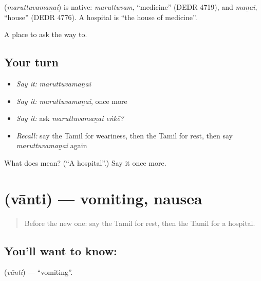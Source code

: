 \begin{cousinweb}
\textbf{} (\emph{maruttuvamaṉai}) is native: \emph{maruttuvam}, \textquotedblleft{}medicine\textquotedblright{} (DEDR 4719), and \emph{maṉai}, \textquotedblleft{}house\textquotedblright{} (DEDR 4776). A hospital is \textquotedblleft{}the house of medicine\textquotedblright{}.
\end{cousinweb}

\begin{grammarlens}[title={What you've built}]
A place to ask the way to.
\end{grammarlens}

\subsection*{Your turn}
\begin{itemize}
\raggedright
  \item \emph{Say it:} \emph{maruttuvamaṉai}
  \item \emph{Say it:} \emph{maruttuvamaṉai}, once more
  \item \emph{Say it:} ask \emph{maruttuvamaṉai eṅkē?}
  \item \emph{Recall:} say the Tamil for weariness, then the Tamil for rest, then say \emph{maruttuvamaṉai} again
\end{itemize}

\begin{tcolorbox}[breakable,colback=teal!4,colframe=teal!35!black,title={Before you move on}]
What does  mean? (\textquotedblleft{}A hospital\textquotedblright{}.) Say it once more.
\end{tcolorbox}
\section[\texorpdfstring{\ta{வாந்தி} (vānti)}{வாந்தி (vānti)}]{ (vānti) — vomiting, nausea}

\label{lesson:TA-C88-vomiting}



\begin{quote}
Before the new one: say the Tamil for rest, then the Tamil for a hospital.
\end{quote}

\subsection*{You'll want to know: }
\textbf{} (\emph{vānti}) — \textquotedblleft{}vomiting\textquotedblright{}.

